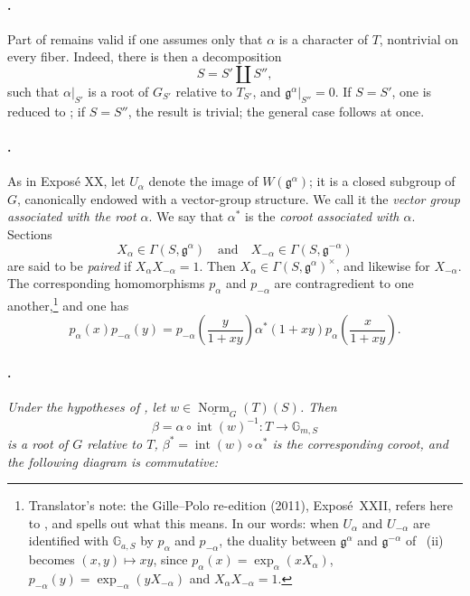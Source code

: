\paragraph{.}
Part  of  remains valid if one assumes only that
\(\alpha\) is a character of \(T\), nontrivial on every fiber. Indeed,
there is then a decomposition
\[
  S=S'\amalg S'',
\]
such that \(\alpha|_{S'}\) is a root of \(G_{S'}\) relative to
\(T_{S'}\), and
\(\mathfrak g^\alpha|_{S''}=0\). If \(S=S'\), one is reduced to ;
if \(S=S''\), the result is trivial; the general case follows at once.

\paragraph{.}
As in Exposé XX, let \(U_\alpha\) denote the image of
\(W(\mathfrak g^\alpha)\); it is a closed subgroup of \(G\),
canonically endowed with a vector-group structure. We call it the
\emph{vector group associated with the root \(\alpha\)}. We say that
\(\alpha^*\) is the \emph{coroot associated with \(\alpha\)}. Sections
\[
  X_\alpha\in\Gamma(S,\mathfrak g^\alpha)
  \quad\text{and}\quad
  X_{-\alpha}\in\Gamma(S,\mathfrak g^{-\alpha})
\]
are said to be \emph{paired} if \(X_\alpha X_{-\alpha}=1\). Then
\(X_\alpha\in\Gamma(S,\mathfrak g^\alpha)^\times\), and likewise for
\(X_{-\alpha}\). The corresponding homomorphisms \(p_\alpha\) and
\(p_{-\alpha}\) are contragredient to one another,\footnote{Translator's note: the Gille--Polo re-edition (2011), Exposé~XXII, refers
here to , and spells out what this means. In our words:
when \(U_\alpha\) and \(U_{-\alpha}\) are identified with
\(\mathbb G_{a,S}\) by \(p_\alpha\) and \(p_{-\alpha}\), the duality
between \(\mathfrak g^\alpha\) and \(\mathfrak g^{-\alpha}\) of
~(ii) becomes \((x,y)\mapsto xy\), since
\(p_\alpha(x)=\exp_\alpha(xX_\alpha)\),
\(p_{-\alpha}(y)=\exp_{-\alpha}(yX_{-\alpha})\) and
\(X_\alpha X_{-\alpha}=1\).} and one has
\[
  p_\alpha(x)p_{-\alpha}(y)
  =
  p_{-\alpha}\left(\frac{y}{1+xy}\right)
  \alpha^*(1+xy)
  p_\alpha\left(\frac{x}{1+xy}\right).
\]

\paragraph{.}
\textit{Under the hypotheses of , let
\(w\in\underline{\operatorname{Norm}}_G(T)(S)\). Then}
\[
  \beta=\alpha\circ\operatorname{int}(w)^{-1}
  :T\longrightarrow\mathbb G_{m,S}
\]
\textit{is a root of \(G\) relative to \(T\),
\(\beta^*=\operatorname{int}(w)\circ\alpha^*\) is the corresponding
coroot, and the following diagram is commutative:}

